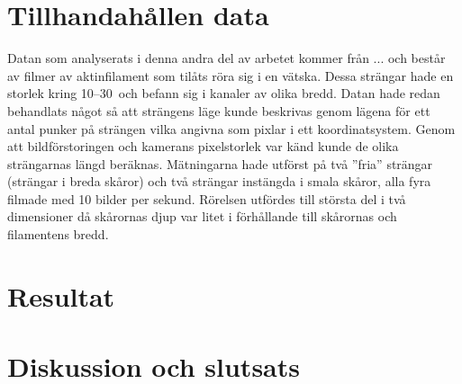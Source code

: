 \section{Tillhandahållen data}

Datan som analyserats i denna andra del av arbetet kommer från ... och består av filmer av aktinfilament som tilåts röra sig i en vätska. Dessa strängar hade en storlek kring 10--30\, och befann sig i kanaler av olika bredd. Datan hade redan behandlats något så att strängens läge kunde beskrivas genom lägena för ett antal punker på strängen vilka angivna som pixlar i ett koordinatsystem. Genom att bildförstoringen och kamerans pixelstorlek var känd kunde de olika strängarnas längd beräknas. Mätningarna hade utförst på två ''fria'' strängar (strängar i breda skåror) och två strängar instängda i smala skåror, alla fyra filmade med 10 bilder per sekund. Rörelsen utfördes till största del i två dimensioner då skårornas djup var litet i förhållande till skårornas och filamentens bredd.

\section{Resultat}



\section{Diskussion och slutsats}





